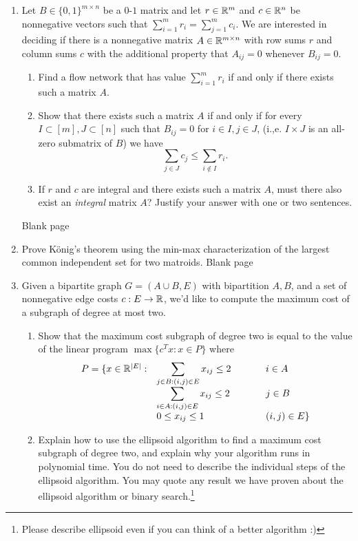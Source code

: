 \documentclass[12pt]{article}
\begin{document}
\begin{enumerate}
\item Let $B \in \{0,1\}^{m\times n}$ be a $0$-$1$ matrix and let $r \in {\mathbb R}^m$ and $c \in {\mathbb R}^n$ be nonnegative vectors such that $\sum_{i = 1}^m r_i = \sum_{j = 1}^m c_i$. We are interested in deciding if there is a nonnegative matrix $A \in {\mathbb R}^{m \times n}$ with row sums $r$ and column sums $c$ with the additional property that $A_{ij} = 0$ whenever $B_{ij} = 0$. 
\begin{enumerate}
\item Find a flow network that has value $\sum_{i = 1}^m r_i$ if and only if there exists such a matrix $A$. 
\item Show that there exists such a matrix $A$ if and only if for every $I \subset [m], J \subset [n]$ such that $B_{ij} = 0$ for $i \in I, j \in J$, (i.,e. $I\times J$ is an all-zero submatrix of $B$) we have
$$\sum_{j \in J} c_j  \leq \sum_{i \not \in I} r_i.$$
\item If $r$ and $c$ are integral and there exists such a matrix $A$, must there also exist an \emph{integral} matrix $A$? Justify your answer with one or two sentences.
\end{enumerate}
\newpage
Blank page 
\newpage 

\item Prove K\"onig's theorem using the min-max characterization of the largest common independent set for two matroids. 
\newpage 
Blank page

\newpage
\item Given a bipartite graph $G = (A \cup B, E)$ with bipartition $A, B$, and a set of nonnegative edge costs $c: E \to {\mathbb R}$, we'd like to compute the maximum cost of a subgraph of degree at most two. 

\begin{enumerate}
\item Show that the maximum cost subgraph of degree two is equal to the value of the linear program $\max\{c^T x: x \in P\}$ where $$ \begin{array}{ll@{\hspace{0.5in}}l}
P=\{ x\in \R^{|E|}: & \displaystyle \sum_{j\in B: (i,j)\in E} x_{ij}
\leq 2 & i \in A \\
& \displaystyle \sum_{i\in A: (i,j)\in E} x_{ij}
\leq 2 & j \in B \\
 & 0 \leq x_{ij}\leq 1 & (i,j)\in E \} \end{array}$$
\item Explain how to use the ellipsoid algorithm to find a maximum cost subgraph of degree two, and explain why your algorithm runs in polynomial time. You do not need to describe the individual steps of the ellipsoid algorithm. You may quote any result we have proven about the ellipsoid algorithm or binary search.\footnote{Please describe ellipsoid even if you can think of a better  algorithm :)} %

\end{enumerate}

\end{enumerate}
\end{document}
